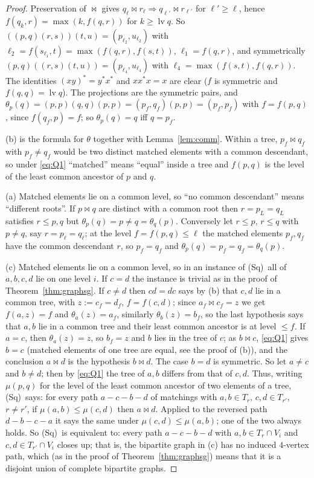 \documentclass[11pt]{amsart}
\theoremstyle{definition}
\newcommand{\mt}{\bowtie}      %
\newcommand{\Wire}{\textup{(Sq)}}      %
\begin{document}
\begin{proof}
Preservation of $\mt$ gives $q_\ell\mt r_\ell\Rightarrow q_{\ell'}\mt r_{\ell'}$ for $\ell'\ge\ell$, hence $f(q_k,r)=\max(k,f(q,r))$ for $k\ge\operatorname{lv}q$. So $((p,q)(r,s))(t,u)=(p_{\ell_2},u_{\ell_2})$ with $\ell_2=f(s_{\ell_1},t)=\max(f(q,r),f(s,t))$, $\ell_1=f(q,r)$, and symmetrically $(p,q)((r,s)(t,u))=(p_{\ell_4},u_{\ell_4})$ with $\ell_4=\max(f(s,t),f(q,r))$. The identities $(xy)^*=y^*x^*$ and $xx^*x=x$ are clear ($f$ is symmetric and $f(q,q)=\operatorname{lv}q$). The projections are the symmetric pairs, and $\theta_p(q)=(p,p)(q,q)(p,p)=(p_f,q_f)(p,p)=(p_f,p_f)$ with $f=f(p,q)$, since $f(q_f,p)=f$; so $\theta_p(q)=q$ iff $q=p_f$.

(b) is the formula for $\theta$ together with Lemma~\ref{lem:comm}. Within a tree, $p_f\mt q_f$ with $p_f\ne q_f$ would be two distinct matched elements with a common descendant, so under \eqref{eq:Q1} ``matched'' means ``equal'' inside a tree and $f(p,q)$ is the level of the least common ancestor of $p$ and $q$.

(a) Matched elements lie on a common level, so ``no common descendant'' means ``different roots''. If $p\mt q$ are distinct with a common root then $r=p_L=q_L$ satisfies $r\le p,q$ but $\theta_p(q)=p\ne q=\theta_q(p)$. Conversely let $r\le p$, $r\le q$ with $p\ne q$, say $r=p_\ell=q_\ell$; at the level $f=f(p,q)\le\ell$ the matched elements $p_f,q_f$ have the common descendant $r$, so $p_f=q_f$ and $\theta_p(q)=p_f=q_f=\theta_q(p)$.

(c) Matched elements lie on a common level, so in an instance of \Wire\ all of $a,b,c,d$ lie on one level $i$. If $c=d$ the instance is trivial as in the proof of Theorem~\ref{thm:graphsg}. If $c\ne d$ then $cd=dc$ says by (b) that $c,d$ lie in a common tree, with $z:=c_f=d_f$, $f=f(c,d)$; since $a_f\mt c_f=z$ we get $f(a,z)=f$ and $\theta_a(z)=a_f$, similarly $\theta_b(z)=b_f$, so the last hypothesis says that $a,b$ lie in a common tree and their least common ancestor is at level $\le f$. If $a=c$, then $\theta_a(z)=z$, so $b_f=z$ and $b$ lies in the tree of $c$; as $b\mt c$, \eqref{eq:Q1} gives $b=c$ (matched elements of one tree are equal, see the proof of (b)), and the conclusion $a\mt d$ is the hypothesis $b\mt d$. The case $b=d$ is symmetric. So let $a\ne c$ and $b\ne d$; then by \eqref{eq:Q1} the tree of $a,b$ differs from that of $c,d$. Thus, writing $\mu(p,q)$ for the level of the least common ancestor of two elements of a tree, \Wire\ says: for every path $a-c-b-d$ of matchings with $a,b\in T_r$, $c,d\in T_{r'}$, $r\ne r'$, if $\mu(a,b)\le\mu(c,d)$ then $a\mt d$. Applied to the reversed path $d-b-c-a$ it says the same under $\mu(c,d)\le\mu(a,b)$; one of the two always holds. So \Wire\ is equivalent to: every path $a-c-b-d$ with $a,b\in T_r\cap V_i$ and $c,d\in T_{r'}\cap V_i$ closes up; that is, the bipartite graph in (c) has no induced $4$-vertex path, which (as in the proof of Theorem~\ref{thm:graphsg}) means that it is a disjoint union of complete bipartite graphs.


\end{proof}
\end{document}
